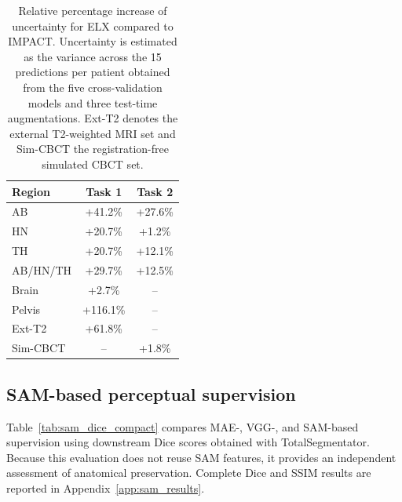 \documentclass[lettersize,journal]{IEEEtran}
\begin{document}
\begin{table}[h!]
\centering
\small
\setlength{\tabcolsep}{6pt}
\renewcommand{\arraystretch}{1.15}
\caption{
Relative percentage increase of uncertainty for ELX compared to IMPACT. 
Uncertainty is estimated as the variance across the 15 predictions per patient obtained from the five cross-validation models and three test-time augmentations. Ext-T2 denotes the external T2-weighted MRI set and Sim-CBCT the registration-free simulated CBCT set.
}
\label{tab:cv_uncertainty_mae_percentage}
\begin{tabular}{lcc}
\toprule
Region & Task 1 & Task 2 \\
\midrule
AB & +41.2\% & +27.6\% \\
HN & +20.7\% & +1.2\% \\
TH & +20.7\% & +12.1\% \\
AB/HN/TH & +29.7\% & +12.5\% \\
\addlinespace[0.25em]
\hline
\hline
\addlinespace[0.25em]
Brain & +2.7\% & -- \\
Pelvis & +116.1\% & --\\
Ext-T2 & +61.8\% & -- \\
Sim-CBCT & -- & +1.8\% \\
\bottomrule
\end{tabular}

\end{table}

\subsection{SAM-based perceptual supervision}

Table~\ref{tab:sam_dice_compact} compares MAE-, VGG-, and SAM-based supervision using downstream Dice scores obtained with
TotalSegmentator. Because this evaluation does not reuse SAM features, it provides an independent assessment of anatomical preservation. Complete Dice and SSIM results are reported in Appendix~\ref{app:sam_results}.
\end{document}
